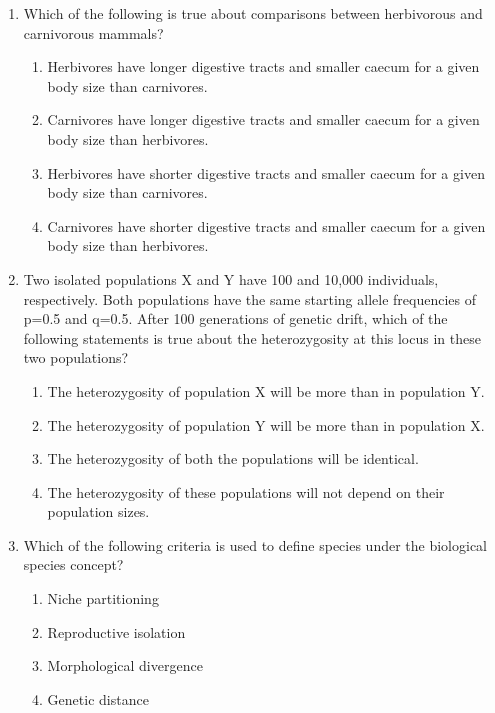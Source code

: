 \begin{enumerate}
\item Which of the following is true about comparisons between herbivorous and carnivorous mammals?
\begin{multicols}{2}
\begin{enumerate}
\item Herbivores have longer digestive tracts and smaller caecum for a given body size than carnivores.
\item Carnivores have longer digestive tracts and smaller caecum for a given body size than herbivores.
\item Herbivores have shorter digestive tracts and smaller caecum for a given body size than carnivores.
\item Carnivores have shorter digestive tracts and smaller caecum for a given body size than herbivores.
\end{enumerate}
\end{multicols}

\item Two isolated populations X and Y have 100 and 10,000 individuals, respectively. Both populations have the same starting allele frequencies of p=0.5 and q=0.5. After 100 generations of genetic drift, which of the following statements is true about the heterozygosity at this locus in these two populations?
\begin{multicols}{2}
\begin{enumerate}
\item The heterozygosity of population X will be more than in population Y.
\item The heterozygosity of population Y will be more than in population X.
\item The heterozygosity of both the populations will be identical.
\item The heterozygosity of these populations will not depend on their population sizes.
\end{enumerate}
\end{multicols}

\item Which of the following criteria is used to define species under the biological species concept?
\begin{multicols}{2}
\begin{enumerate}
\item Niche partitioning
\item Reproductive isolation
\item Morphological divergence
\item Genetic distance
\end{enumerate}
\end{multicols}


\end{enumerate}
